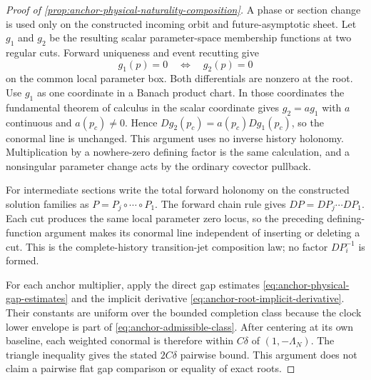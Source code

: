 \begin{proof}[Proof of \cref{prop:anchor-physical-naturality-composition}]
A phase or section change is used only on the constructed incoming orbit and
future-asymptotic sheet.  Let \(g_1\) and \(g_2\) be the resulting scalar
parameter-space membership functions at two regular cuts.  Forward uniqueness
and event recutting give
\[
 g_1(p)=0\quad\Longleftrightarrow\quad g_2(p)=0
\]
on the common local parameter box.  Both differentials are nonzero at the
root.  Use \(g_1\) as one coordinate in a Banach product chart.  In those
coordinates the fundamental theorem of calculus in the scalar coordinate
gives \(g_2=a g_1\) with \(a\) continuous and
\(a(p_c)\ne0\).  Hence \(Dg_2(p_c)=a(p_c)Dg_1(p_c)\), so the conormal line is
unchanged.  This argument uses no inverse history holonomy.  Multiplication by
a nowhere-zero defining factor is the same calculation, and a nonsingular
parameter change acts by the ordinary covector pullback.

For intermediate sections write the total forward holonomy on the constructed
solution families as \(P=P_j\circ\cdots\circ P_1\).  The forward chain rule
gives \(DP=DP_j\cdots DP_1\).  Each cut produces the same local parameter
zero locus, so the preceding defining-function argument makes its conormal
line independent of inserting or deleting a cut.  This is the
complete-history transition-jet composition law; no factor \(DP_i^{-1}\) is
formed.

For each anchor multiplier, apply the direct gap estimates
\cref{eq:anchor-physical-gap-estimates} and the implicit derivative
\cref{eq:anchor-root-implicit-derivative}.  Their constants are uniform over
the bounded completion class because the clock lower envelope is part of
\cref{eq:anchor-admissible-class}.  After centering at its own baseline,
each weighted conormal is therefore within \(C\delta\) of
\((1,-\Lambda_N)\).  The triangle inequality gives the stated
\(2C\delta\) pairwise bound.  This argument does not claim a pairwise flat
gap comparison or equality of exact roots.
\end{proof}
